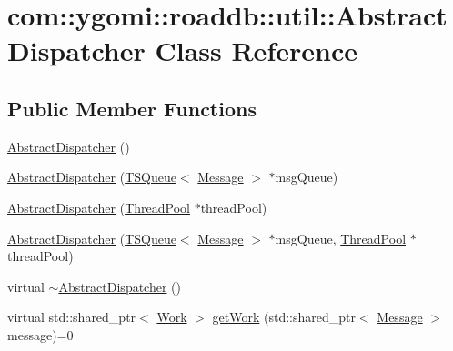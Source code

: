 \hypertarget{classcom_1_1ygomi_1_1roaddb_1_1util_1_1AbstractDispatcher}{\section{com\-:\-:ygomi\-:\-:roaddb\-:\-:util\-:\-:Abstract\-Dispatcher Class Reference}
\label{classcom_1_1ygomi_1_1roaddb_1_1util_1_1AbstractDispatcher}
}
\subsection*{Public Member Functions}
\begin{DoxyCompactItemize}
\item 
\hyperlink{classcom_1_1ygomi_1_1roaddb_1_1util_1_1AbstractDispatcher_a2e860edf89bd3155f1ce6cc3064304a1}{Abstract\-Dispatcher} ()
\item 
\hyperlink{classcom_1_1ygomi_1_1roaddb_1_1util_1_1AbstractDispatcher_ab44bef08a5b9db58dd95ac3584076747}{Abstract\-Dispatcher} (\hyperlink{classcom_1_1ygomi_1_1roaddb_1_1util_1_1TSQueue}{T\-S\-Queue}$<$ \hyperlink{classcom_1_1ygomi_1_1roaddb_1_1util_1_1Message}{Message} $>$ $\ast$msg\-Queue)
\item 
\hyperlink{classcom_1_1ygomi_1_1roaddb_1_1util_1_1AbstractDispatcher_a7a124cba04ea69769b41d73a10b39c22}{Abstract\-Dispatcher} (\hyperlink{classcom_1_1ygomi_1_1roaddb_1_1util_1_1ThreadPool}{Thread\-Pool} $\ast$thread\-Pool)
\item 
\hyperlink{classcom_1_1ygomi_1_1roaddb_1_1util_1_1AbstractDispatcher_a4f2e1384403028d54fbe78854ea3fb9b}{Abstract\-Dispatcher} (\hyperlink{classcom_1_1ygomi_1_1roaddb_1_1util_1_1TSQueue}{T\-S\-Queue}$<$ \hyperlink{classcom_1_1ygomi_1_1roaddb_1_1util_1_1Message}{Message} $>$ $\ast$msg\-Queue, \hyperlink{classcom_1_1ygomi_1_1roaddb_1_1util_1_1ThreadPool}{Thread\-Pool} $\ast$thread\-Pool)
\item 
virtual \hyperlink{classcom_1_1ygomi_1_1roaddb_1_1util_1_1AbstractDispatcher_a3f1800c1708851f9c597eeada99baa93}{$\sim$\-Abstract\-Dispatcher} ()
\item 
virtual std\-::shared\-\_\-ptr$<$ \hyperlink{classcom_1_1ygomi_1_1roaddb_1_1util_1_1Work}{Work} $>$ \hyperlink{classcom_1_1ygomi_1_1roaddb_1_1util_1_1AbstractDispatcher_ae8da99ca541d0172aa4bcf1e90ed7b3a}{get\-Work} (std\-::shared\-\_\-ptr$<$ \hyperlink{classcom_1_1ygomi_1_1roaddb_1_1util_1_1Message}{Message} $>$ message)=0
\item 

\end{DoxyCompactItemize}
